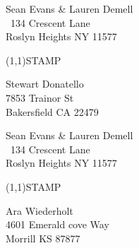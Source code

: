 \documentclass[12pt]{article}
\begin{document}
\clearpage

\begin{minipage}{.5\linewidth} \noindent
Sean Evans \& Lauren Demell\\\ 
134 Crescent Lane\\ 
Roslyn Heights NY 11577
\end{minipage}
\begin{minipage}{.5\linewidth \hspace{-.2in} \vspace{-.3in}}
\begin{flushright}
\framebox(1,1){STAMP}
\end{flushright}
\end{minipage}

\begin{center} \begin{Huge} \vspace*{\fill}
Stewart Donatello\\
7853 Trainor St\\
Bakersfield CA 22479\\
\vspace{\fill} \end{Huge} \end{center}

\clearpage

\begin{minipage}{.5\linewidth} \noindent
Sean Evans \& Lauren Demell\\\ 
134 Crescent Lane\\ 
Roslyn Heights NY 11577
\end{minipage}
\begin{minipage}{.5\linewidth \hspace{-.2in} \vspace{-.3in}}
\begin{flushright}
\framebox(1,1){STAMP}
\end{flushright}
\end{minipage}

\begin{center} \begin{Huge} \vspace*{\fill}
Ara Wiederholt\\
4601 Emerald cove Way\\
Morrill KS 87877\\
\vspace{\fill} \end{Huge} \end{center}
\end{document}
